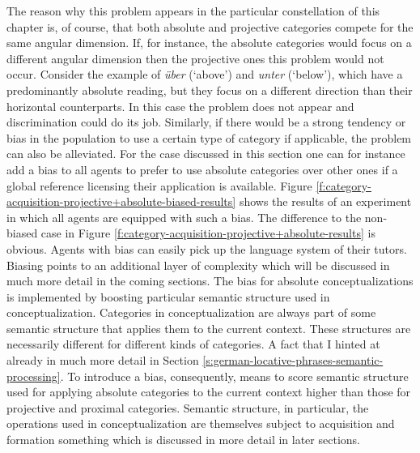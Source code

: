 The reason why this problem appears in the particular constellation of this chapter is, of course, 
that both absolute and projective categories compete for the same angular dimension. 
If, for instance, the absolute categories would focus on a different angular dimension then
the projective ones this problem would not occur. Consider the 
example of \textit{über} (`above') and \textit{unter} (`below'), which have a 
predominantly absolute reading, but they focus on a
different direction than their horizontal counterparts. In this case the problem
does not appear and discrimination could do its job. Similarly, if there would 
be a strong tendency or bias in the population to use a certain type of category if applicable, 
the problem can also be alleviated. 
For the case discussed in this section one can for instance add a bias to all agents 
to prefer to use absolute categories over other ones if a global reference licensing 
their application is available. Figure 
\ref{f:category-acquisition-projective+absolute-biased-results}
shows the results of  an experiment in which all agents are equipped with such a bias.
The difference to the non-biased case in Figure \ref{f:category-acquisition-projective+absolute-results}
is obvious. Agents with bias can easily pick up the language system of their tutors. 
Biasing points to an additional layer of complexity which will be discussed in much
more detail in the coming sections. The bias for absolute conceptualizations 
is implemented by boosting particular
semantic structure used in conceptualization. Categories in conceptualization
are always part of some semantic structure that applies them to the current context.
These structures are necessarily different for different kinds of categories. A fact that
I hinted at already in much more detail in Section \ref{s:german-locative-phrases-semantic-processing}.
To introduce a bias, consequently, means to score semantic structure used for applying absolute categories
to the current context higher than those for projective and proximal categories.
Semantic structure, in particular, the operations used in conceptualization are 
themselves subject to acquisition and formation something which is discussed
in more detail in later sections. 


